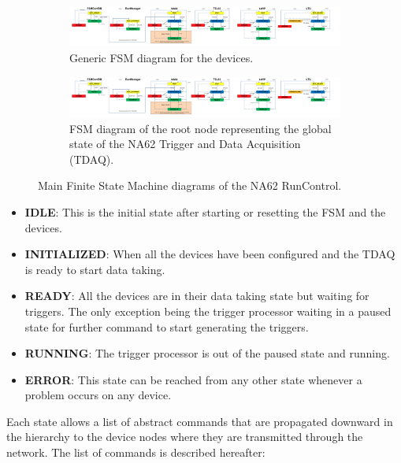 \documentclass[a4paper]{article}
\begin{document}
\begin{figure}
	\centering
	\begin{subfigure}{0.49\textwidth}
		\includegraphics[page=3,width=1.15\textwidth]{Doc/FullFSM.pdf}
		\caption{Generic FSM diagram for the devices.\newline}
		\label{fig:FSM_Device}
	\end{subfigure}
	\begin{subfigure}{0.49\textwidth}
		\includegraphics[page=2,width=1.15\textwidth]{Doc/FullFSM.pdf}
		\caption{FSM diagram of the root node representing the global state of the NA62 Trigger and
		Data Acquisition (TDAQ).}
		\label{fig:FSM_Main}
	\end{subfigure}
	\caption{Main Finite State Machine diagrams of the NA62 RunControl.}
\end{figure}

\begin{itemize}
	\item \textbf{IDLE}: This is the initial state after starting or resetting the FSM and the devices.
	\item \textbf{INITIALIZED}: When all the devices have been configured and the
	TDAQ is ready to start data taking.
	\item \textbf{READY}: All the devices are in their data taking state but
	waiting for triggers. The only exception being the trigger processor waiting in
	a paused state for further command to start generating the triggers.
	\item \textbf{RUNNING}: The trigger processor is out of the paused state and running.
	\item \textbf{ERROR}: This state can be reached from any other state whenever a problem occurs on
	any device.
\end{itemize}

Each state allows a list of abstract commands that are propagated downward in the hierarchy to
the device nodes where they are transmitted through the network. The list of commands is described
hereafter:
\end{document}
